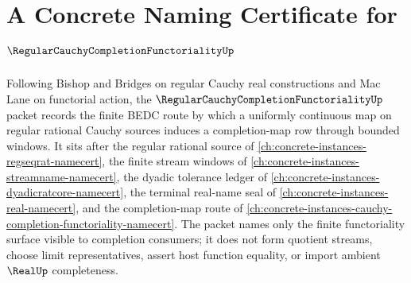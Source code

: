 \chapter{A Concrete Naming Certificate for $\RegularCauchyCompletionFunctorialityUp$}
\label{ch:concrete-instances-regular-cauchy-completion-functoriality-namecert}

Following Bishop and Bridges on regular Cauchy real constructions and Mac Lane on functorial action, the $\RegularCauchyCompletionFunctorialityUp$ packet records the finite BEDC route by which a uniformly continuous map on regular rational Cauchy sources induces a completion-map row through bounded windows. It sits after the regular rational source of \autoref{ch:concrete-instances-regseqrat-namecert}, the finite stream windows of \autoref{ch:concrete-instances-streamname-namecert}, the dyadic tolerance ledger of \autoref{ch:concrete-instances-dyadicratcore-namecert}, the terminal real-name seal of \autoref{ch:concrete-instances-real-namecert}, and the completion-map route of \autoref{ch:concrete-instances-cauchy-completion-functoriality-namecert}. The packet names only the finite functoriality surface visible to completion consumers; it does not form quotient streams, choose limit representatives, assert host function equality, or import ambient $\RealUp$ completeness.

